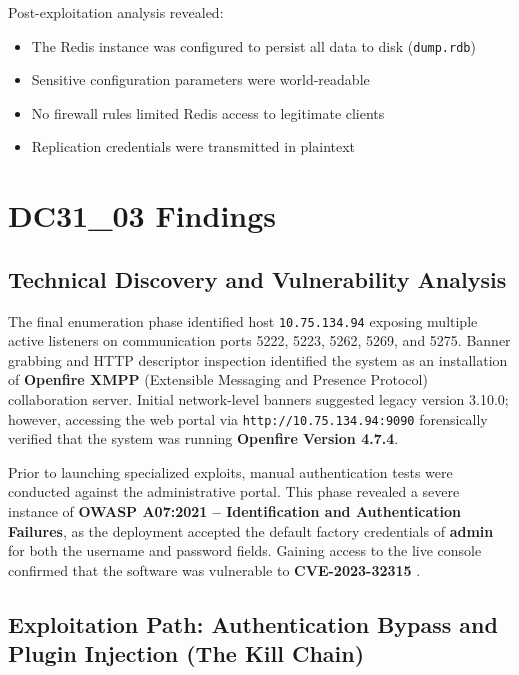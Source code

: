 \documentclass[11pt,a4paper]{article}
\begin{document}
Post-exploitation analysis revealed:
\begin{itemize}
    \item The Redis instance was configured to persist all data to disk (\texttt{dump.rdb})
    \item Sensitive configuration parameters were world-readable
    \item No firewall rules limited Redis access to legitimate clients
    \item Replication credentials were transmitted in plaintext
\end{itemize}


\section{DC31\_03 Findings}

\subsection{Technical Discovery and Vulnerability Analysis}

The final enumeration phase identified host \texttt{10.75.134.94} exposing multiple active listeners on communication ports 5222, 5223, 5262, 5269, and 5275. Banner grabbing and HTTP descriptor inspection identified the system as an installation of \textbf{Openfire XMPP} (Extensible Messaging and Presence Protocol) collaboration server. Initial network-level banners suggested legacy version 3.10.0; however, accessing the web portal via \texttt{http://10.75.134.94:9090} forensically verified that the system was running \textbf{Openfire Version 4.7.4}.

Prior to launching specialized exploits, manual authentication tests were conducted against the administrative portal. This phase revealed a severe instance of \textbf{OWASP A07:2021 -- Identification and Authentication Failures}, as the deployment accepted the default factory credentials of \textbf{admin} for both the username and password fields. Gaining access to the live console confirmed that the software was vulnerable to \textbf{CVE-2023-32315} \citep{NVD2023}.

\subsection{Exploitation Path: Authentication Bypass and Plugin Injection (The Kill Chain)}
\end{document}
